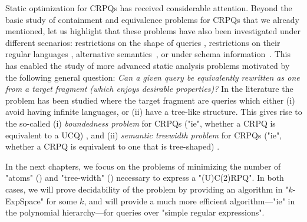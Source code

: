 Static optimization for CRPQs has received considerable attention. Beyond the basic study of containment and equivalence problems for CRPQs that we already mentioned,
let us highlight that
these problems have also been investigated under different scenarios: restrictions on the shape of queries \cite{Figueira2020Containment}, restrictions on their regular languages \cite{FigueiraEtal2020Containment}, alternative semantics~\cite{FigueiraRomero23}, or under schema information~\cite{GutierresBasultoGutowskiIbanezGarciaMurlak2022Finite,GutierresBasultoGutowskiIbanezGarciaMurlak2024Containment}.
This has enabled the study of more advanced static analysis problems motivated by the following general question: \emph{Can a given query be equivalently rewritten as one from a target fragment (which enjoys desirable properties)?}
In the literature the problem has been studied where the target fragment are queries which either (i) avoid having infinite languages, or (ii) have a tree-like structure. This gives rise to the so-called (i) \emph{boundedness problem} for CRPQs ("ie", whether a CRPQ is equivalent to a UCQ) \cite{BarceloFigueiraRomero2019Boundedness,FigueiraKrishnaSwostikMishraPadmanabha2024Boundedness}, and (ii) \emph{semantic treewidth problem} for CRPQs ("ie", whether a CRPQ is equivalent to one 
that is tree-shaped) \cite{BarceloRomeroVardi2016SemanticAcyclicity}.

In the next chapters,
we focus on the problems of minimizing the number of "atoms"
() and "tree-width" ()
necessary to express a "(U)C(2)RPQ". In both cases,
we will prove decidability of the problem by providing an algorithm in
"$k$-ExpSpace" for some $k$, and will provide a much more efficient algorithm---"ie" in the
polynomial hierarchy---for queries over "simple regular expressions".









